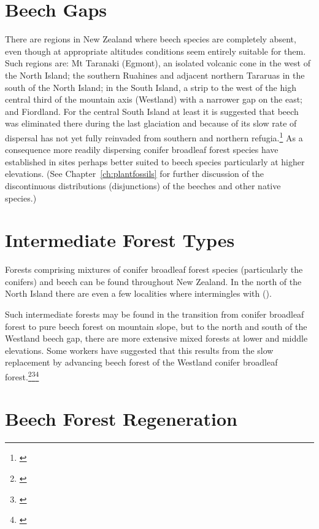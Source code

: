\section{Beech Gaps}

There are regions in New Zealand where beech species are completely absent, even though at appropriate altitudes conditions seem entirely suitable for them.
Such regions are: Mt Taranaki (Egmont), an isolated volcanic cone in the west of the North Island; the southern Ruahines and adjacent northern Tararuas in the south of the North Island; in the South Island, a strip to the west of the high central third of the mountain axis (Westland) with a narrower gap on the east; and Fiordland.
For the central South Island at least it is suggested that beech was eliminated there during the last glaciation and because of its slow rate of dispersal has not yet fully reinvaded from southern and northern refugia.\footnote{\cite{wardle1965comparison}}
As a consequence more readily dispersing conifer broadleaf forest species have established in sites perhaps better suited to beech species particularly at higher elevations. (See Chapter~\ref{ch:plantfossils}  for further discussion of the discontinuous distributions (disjunctions) of the beeches and other native species.)

\section{Intermediate Forest Types}

Forests comprising mixtures of conifer broadleaf forest species (particularly the conifers) and beech can be found throughout New Zealand.
In the north of the North Island there are even a few localities where  intermingles with  ().

Such intermediate forests may be found in the transition from conifer broadleaf forest to pure beech forest on mountain slope, but to the north and south of the Westland beech gap, there are more extensive mixed forests at lower and middle elevations.
Some workers have suggested that this results from the slow replacement by advancing beech forest of the Westland conifer broadleaf forest.\footnote{\cite{holloway1954forests}}\footnote{\cite{wardle1964facets}}\footnote{\cite{wardle1980ecology}}

\section{Beech Forest Regeneration}


